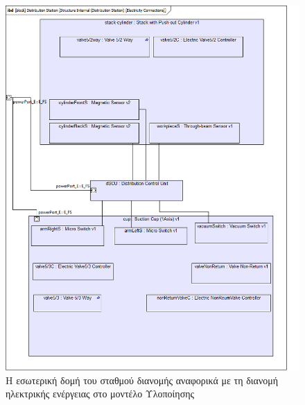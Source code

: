 \documentclass[a4paper,12pt,twoside]{report}
\begin{document}
{\begin{appendices}
				\begin{figure}[hp]
					\centering
					\includegraphics[scale=0.50]{DesignModel_StructureInternal(DistributionStation)[ElectricityConnections].png}
					\caption{Η εσωτερική δομή του σταθμού διανομής αναφορικά με τη διανομή ηλεκτρικής ενέργειας στο μοντέλο Υλοποίησης}
					\label{φωτ:Η εσωτερική δομή του σταθμού διανομής αναφορικά με τη διανομή ηλεκτρικής ενέργειας στο μοντέλο Υλοποίησης}
				\end{figure}
				

\end{appendices}}
\end{document}
